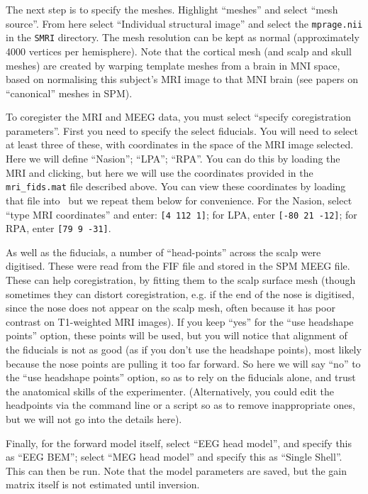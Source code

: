 The next step is to specify the meshes. Highlight ``meshes'' and select ``mesh source''. From here select ``Individual structural image'' and select the \texttt{mprage.nii} in the \texttt{SMRI} directory. The mesh resolution can be kept as normal (approximately 4000 vertices per hemisphere). Note that the cortical mesh (and scalp and skull meshes) are created by warping template meshes from a brain in MNI space, based on normalising this subject's MRI image to that MNI brain (see papers on ``canonical'' meshes in SPM).

To coregister the MRI and MEEG data, you must select ``specify coregistration parameters''. First you need to specify the select fiducials. You will need to select at least three of these, with coordinates in the space of the MRI image selected. Here we will define ``Nasion''; ``LPA''; ``RPA''. You can do this by loading the MRI and clicking, but here we will use the coordinates provided in the \texttt{mri\_fids.mat} file described above. You can view these coordinates by loading that file into \matlab\, but we repeat them below for convenience. For the Nasion, select ``type MRI coordinates'' and enter: \texttt{[4 112 1]}; for LPA, enter \texttt{[-80 21 -12]}; for RPA, enter \texttt{[79 9 -31]}.

As well as the fiducials, a number of ``head-points'' across the scalp were digitised. These were read from the FIF file and stored in the SPM MEEG file. These can help coregistration, by fitting them to the scalp surface mesh (though sometimes they can distort coregistration, e.g. if the end of the nose is digitised, since the nose does not appear on the scalp mesh, often because it has poor contrast on T1-weighted MRI images). If you keep ``yes'' for the ``use headshape points'' option, these points will be used, but you will notice that alignment of the fiducials is not as good (as if you don't use the headshape points), most likely because the nose points are pulling it too far forward. So here we will say ``no'' to the ``use headshape points'' option, so as to rely on the fiducials alone, and trust the anatomical skills of the experimenter. (Alternatively, you could edit the headpoints via the command line or a script so as to remove inappropriate ones, but we will not go into the details here).

Finally, for the forward model itself, select ``EEG head model'', and specify this as ``EEG BEM''; select ``MEG head model'' and specify this as ``Single Shell''. This can then be run. Note that the model parameters are saved, but the gain matrix itself is not estimated until inversion.

